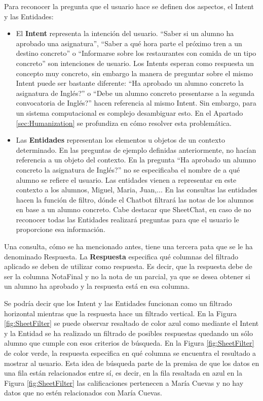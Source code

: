 Para reconocer la pregunta que el usuario hace se definen dos aspectos, el Intent y las Entidades:
\begin{itemize}
	\item El \textbf{Intent} representa la intención del usuario. ``Saber si un alumno ha aprobado una asignatura'', ``Saber a qué hora parte el próximo tren a un destino concreto'' o ``Informarse sobre los restaurantes con comida de un tipo concreto'' son intenciones de usuario. Los Intents esperan como respuesta un concepto muy concreto, sin embargo la manera de preguntar sobre el mismo Intent puede ser bastante diferente: ``Ha aprobado un alumno concreto la asignatura de Inglés?'' o ``Debe un alumno concreto presentarse a la segunda convocatoria de Inglés?'' hacen referencia al mismo Intent. Sin embargo, para un sistema computacional es complejo desambiguar esto. En el Apartado \ref{sec:Humanization} se profundiza en cómo resolver esta problemática.
	\item Las \textbf{Entidades} representan los elementos u objetos de un contexto determinado. En las preguntas de ejemplo definidas anteriormente, no hacían referencia a un objeto del contexto. En la pregunta ``Ha aprobado un alumno concreto la asignatura de Inglés?'' no se especificaba el nombre de a qué alumno se refiere el usuario. Las entidades vienen a representar en este contexto a los alumnos, Miguel, Maria, Juan,... En las consultas las entidades hacen la función de filtro, dónde el Chatbot filtrará las notas de los alumnos en base a un alumno concreto. Cabe destacar que SheetChat, en caso de no reconocer todas las Entidades realizará preguntas para que el usuario le proporcione esa información.
\end{itemize}

Una consulta, cómo se ha mencionado antes, tiene una tercera pata que se le ha denominado Respuesta. La \textbf{Respuesta} especifica qué columnas del filtrado aplicado se deben de utilizar como respuesta. Es decir, que la respuesta debe de ser la columna NotaFinal y no la nota de un parcial, ya que se desea obtener si un alumno ha aprobado y la respuesta está en esa columna.

Se podría decir que los Intent y las Entidades funcionan como un filtrado horizontal mientras que la respuesta hace un filtrado vertical. En la Figura \ref{fig:SheetFilter} se puede observar resaltado de color azul como mediante el Intent y la Entidad se ha realizado un filtrado de posibles respuestas quedando un sólo alumno que cumple con esos criterios de búsqueda. En la Figura \ref{fig:SheetFilter} de color verde, la respuesta especifica en qué columna se encuentra el resultado a mostrar al usuario. Esta idea de búsqueda parte de la premisa de que los datos en una fila están relacionados entre sí, es decir, en la fila resaltada en azul en la Figura \ref{fig:SheetFilter} las calificaciones pertenecen a María Cuevas y no hay datos que no estén relacionados con María Cuevas.


